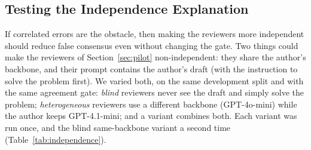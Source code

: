 \subsection{Testing the Independence Explanation}
\label{sec:independence}

If correlated errors are the obstacle, then making the reviewers more independent should reduce false consensus even without changing the gate.
Two things could make the reviewers of Section~\ref{sec:pilot} non-independent: they share the author's backbone, and their prompt contains the author's draft (with the instruction to solve the problem first).
We varied both, on the same development split and with the same agreement gate: \emph{blind} reviewers never see the draft and simply solve the problem; \emph{heterogeneous} reviewers use a different backbone (GPT-4o-mini) while the author keeps GPT-4.1-mini; and a variant combines both.
Each variant was run once, and the blind same-backbone variant a second time (Table~\ref{tab:independence}).

\begin{table}[!t]
\caption{Independence interventions on the development split (210 questions, author GPT-4.1-mini; one run each, two for the blind variant). Reproduce: share of incorrect drafts for which \emph{both} reviewers independently give the author's wrong answer. Rev.\ acc.: accuracy of the reviewers' own first-round answers. Other columns as in Table~\ref{tab:gate}.}
\label{tab:independence}
\footnotesize
\setlength{\tabcolsep}{2.5pt}
\end{table}

